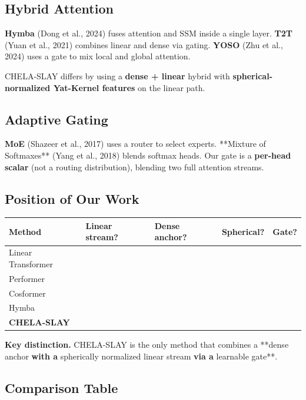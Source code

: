 \subsection{Hybrid Attention}

\textbf{Hymba} (Dong et al., 2024) fuses attention and SSM inside a single 
layer. \textbf{T2T} (Yuan et al., 2021) combines linear and dense via gating. 
\textbf{YOSO} (Zhu et al., 2024) uses a gate to mix local and global attention.

CHELA-SLAY differs by using a \textbf{dense + linear} hybrid with 
\textbf{spherical-normalized Yat-Kernel features} on the linear path.

\subsection{Adaptive Gating}

\textbf{MoE} (Shazeer et al., 2017) uses a router to select experts. **Mixture 
of Softmaxes** (Yang et al., 2018) blends softmax heads. Our gate is a 
\textbf{per-head scalar} (not a routing distribution), blending two full 
attention streams.

\subsection{Position of Our Work}

\begin{table}[H]
\centering
\small
\begin{tabular}{lllll}
\toprule
\textbf{Method} & \textbf{Linear stream?} & \textbf{Dense anchor?} & \textbf{Spherical?} & \textbf{Gate?} \\
\midrule
Linear Transformer &  &  &  &  \\
Performer &  &  &  &  \\
Cosformer &  &  &  &  \\
Hymba &  &  &  &  \\
\textbf{CHELA-SLAY} &  &  &  &  \\
\bottomrule
\end{tabular}
\end{table}

\textbf{Key distinction.} CHELA-SLAY is the only method that combines a **dense 
anchor\textbf{ with a }spherically normalized linear stream\textbf{ via a }learnable 
gate**.



\subsection{Comparison Table}

